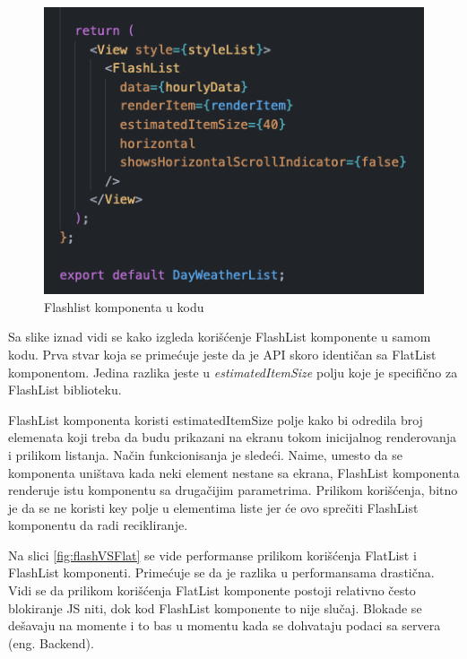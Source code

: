 \documentclass[12pt,oneside]{memoir}
\begin{document}
\begin{figure}[h!]
    \centering
    \includegraphics[scale=0.5]{docs/images/chapterFive/flashlistExample.png}
    \caption{Flashlist komponenta u kodu}
    \label{fig:flashListExample}
\end{figure}

Sa slike iznad vidi se kako izgleda korišćenje FlashList komponente u samom kodu. Prva stvar koja se primećuje jeste da je API skoro identičan sa FlatList komponentom. Jedina razlika jeste u \textit{estimatedItemSize} polju koje je specifično za FlashList biblioteku.


FlashList komponenta koristi estimatedItemSize polje kako bi odredila broj elemenata koji treba da budu prikazani na ekranu tokom inicijalnog renderovanja i prilikom listanja. Način funkcionisanja je sledeći. Naime, umesto da se komponenta uništava kada neki element nestane sa ekrana, FlashList komponenta renderuje istu komponentu sa drugačijim parametrima. Prilikom korišćenja, bitno je da se ne koristi key polje u elementima liste jer će ovo sprečiti FlashList komponentu da radi recikliranje.


Na slici \ref{fig:flashVSFlat} se vide performanse prilikom korišćenja FlatList i FlashList komponenti. Primećuje se da je razlika u performansama drastična. Vidi se da prilikom korišćenja FlatList komponente postoji relativno često blokiranje JS niti, dok kod FlashList komponente to nije slučaj. Blokade se dešavaju na momente i to bas u momentu kada se dohvataju podaci sa servera (eng. Backend).
\end{document}
